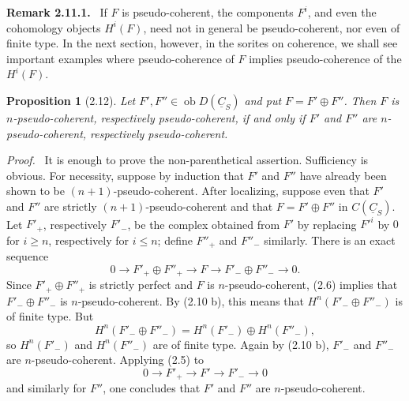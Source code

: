 \documentclass[13pt]{extarticle}
\newcommand{\uC}{\underline C}
\newcommand{\ob}{\operatorname{ob}}
\newenvironment{prooftext}[1][Proof]{\par\noindent\emph{#1.}\ }{\par\medskip}
\newenvironment{remarktext}[1][Remark]{\par\noindent\textbf{#1.}\ }{\par\medskip}
\newtheorem*{proposition*}{Proposition}
\begin{document}
\begin{remarktext}[Remark 2.11.1]
If $F$ is pseudo-coherent, the components $F^i$, and even the cohomology objects $H^i(F)$, need not in general be pseudo-coherent, nor even of finite type. In the next section, however, in the sorites on coherence, we shall see important examples where pseudo-coherence of $F$ implies pseudo-coherence of the $H^i(F)$.
\end{remarktext}

\begin{proposition*}[2.12]
Let $F',F''\in\ob D(\uC_S)$ and put $F=F'\oplus F''$. Then $F$ is $n$-pseudo-coherent, respectively pseudo-coherent, if and only if $F'$ and $F''$ are $n$-pseudo-coherent, respectively pseudo-coherent.
\end{proposition*}

\begin{prooftext}
It is enough to prove the non-parenthetical assertion. Sufficiency is obvious. For necessity, suppose by induction that $F'$ and $F''$ have already been shown to be $(n+1)$-pseudo-coherent. After localizing, suppose even that $F'$ and $F''$ are strictly $(n+1)$-pseudo-coherent and that $F=F'\oplus F''$ in $C(\uC_S)$. Let $F'_+$, respectively $F'_-$, be the complex obtained from $F'$ by replacing $F'^i$ by $0$ for $i\geq n$, respectively for $i\leq n$; define $F''_+$ and $F''_-$ similarly. There is an exact sequence
\[
0\longrightarrow F'_+\oplus F''_+\longrightarrow F\longrightarrow F'_-\oplus F''_-\longrightarrow0.
\]
Since $F'_+\oplus F''_+$ is strictly perfect and $F$ is $n$-pseudo-coherent, (2.6) implies that $F'_-\oplus F''_-$ is $n$-pseudo-coherent. By (2.10 b), this means that $H^n(F'_-\oplus F''_-)$ is of finite type. But
\[
H^n(F'_-\oplus F''_-)=H^n(F'_-)
\oplus H^n(F''_-),
\]
so $H^n(F'_-)$ and $H^n(F''_-)$ are of finite type. Again by (2.10 b), $F'_-$ and $F''_-$ are $n$-pseudo-coherent. Applying (2.5) to
\[
0\longrightarrow F'_+\longrightarrow F'\longrightarrow F'_-\longrightarrow0
\]
and similarly for $F''$, one concludes that $F'$ and $F''$ are $n$-pseudo-coherent.
\end{prooftext}
\end{document}
